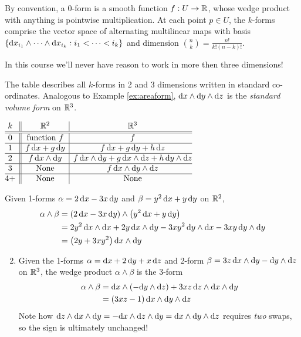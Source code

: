 By convention, a 0-form is a smooth function $f:U\to\mathbb{R}$, whose wedge product with anything is pointwise multiplication. At each point $p\in U$, the $k$-forms comprise the vector space of alternating multilinear maps with basis $\{{\mathrm{d} x}_{i_1}\wedge\cdots\wedge{\mathrm{d}x}_{i_k}:i_1<\cdots<i_k\}$ and dimension $\binom nk=\frac{n!}{k!(n-k)!}$.\smallbreak

In this course we'll never have reason to work in more then three dimensions!\smallbreak


\begin{minipage}[t]{0.44\linewidth}\vspace{0pt}
The table describes all $k$-forms in 2 and 3 dimensions written in standard co-ordinates.\smallbreak
Analogous to Example \ref{ex:areaform}, ${\mathrm{d} x}\wedge{\mathrm{d}y}\wedge{\mathrm{d}z}$ is the \emph{standard volume form} on $\mathbb{R}^3$.
\end{minipage}\hfill\begin{minipage}[t]{0.52\linewidth}\vspace{0pt}
\flushright$\begin{array}{@{}c||c|c@{}}
	k&\R^2&\R^3\\\hline\hline
	0&\text{function }f&f\\\hline
	1&f\,\dx+g\,\dy & f\,\dx+g\,\dy+h\,\dz\\\hline
	2&f\,\dx\wedge\dy&f\,\dx\wedge\dy+g\,\dx\wedge\dz +h\,\dy\wedge\dz\\\hline
	3&\text{None}&f\,\dx\wedge\dy\wedge\dz\\\hline
	4+&\text{None}&\text{None}
\end{array}$
\end{minipage}


\begin{examples}{}{}
	\exstart Given 1-forms $\alpha=2\,{\mathrm{d} x}-3x\,{\mathrm{d} y}$ and $\beta=y^2\,{\mathrm{d} x}+y\,{\mathrm{d} y}$ on $\mathbb{R}^2$,
	\begin{align*}
		\alpha\wedge\beta&=(2\,{\mathrm{d} x}-3x\,{\mathrm{d} y})\wedge\bigl(y^2\,{\mathrm{d} x}+y\,{\mathrm{d} y}\bigr)\\
		&=2y^2\,{\mathrm{d} x}\wedge{\mathrm{d}x} +2y\,{\mathrm{d} x}\wedge{\mathrm{d}y} -3xy^2\,{\mathrm{d} y}\wedge{\mathrm{d}x} -3xy\,{\mathrm{d} y}\wedge{\mathrm{d}y}\\
		&=\bigl(2y+3xy^2\bigr)\,{\mathrm{d} x}\wedge{\mathrm{d}y}
	\end{align*}
	
	\begin{enumerate}\setcounter{enumi}{1}
		\item Given the 1-forms $\alpha={\mathrm{d} x}+2\,{\mathrm{d} y}+x\,{\mathrm{d} z}$ and 2-form $\beta=3z\,{\mathrm{d} x}\wedge{\mathrm{d}y}-{\mathrm{d} y}\wedge{\mathrm{d}z}$ on $\mathbb{R}^3$, the wedge product $\alpha\wedge\beta$ is the 3-form
		\begin{align*}
			\alpha\wedge\beta&={\mathrm{d} x}\wedge(-{\mathrm{d} y}\wedge{\mathrm{d}z})+3xz\,{\mathrm{d} z}\wedge{\mathrm{d}x}\wedge{\mathrm{d}y}\\
			&=(3xz-1)\,{\mathrm{d} x}\wedge{\mathrm{d}y}\wedge{\mathrm{d}z}
		\end{align*}
		Note how ${\mathrm{d} z}\wedge{\mathrm{d}x}\wedge{\mathrm{d}y}=-{\mathrm{d} x}\wedge{\mathrm{d}z}\wedge{\mathrm{d}y}={\mathrm{d} x}\wedge{\mathrm{d}y}\wedge{\mathrm{d}z}$ requires \emph{two} swaps, so the sign is ultimately unchanged!
	\end{enumerate}
\end{examples}



